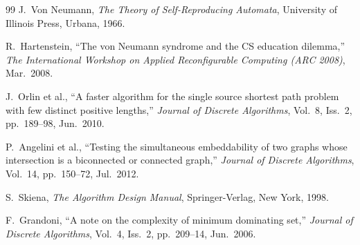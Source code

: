 \documentclass[11pt]{article}
\begin{document}
\begin{thebibliography}{99}
J.~Von Neumann,
\textit{The Theory of Self-Reproducing Automata},
University of Illinois Press, Urbana, 1966.

R.~Hartenstein,
``The von Neumann syndrome and the CS education dilemma,''
\textit{The International Workshop on Applied Reconfigurable Computing (ARC 2008)},
Mar.~2008.

J.~Orlin et al.,
``A faster algorithm for the single source shortest path problem with few distinct positive lengths,''
\textit{Journal of Discrete Algorithms},
Vol.~8, Iss.~2, pp.~189--98, Jun.~2010.

P.~Angelini et al.,
``Testing the simultaneous embeddability of two graphs whose intersection is a biconnected or connected graph,''
\textit{Journal of Discrete Algorithms},
Vol.~14, pp.~150--72, Jul.~2012.

S.~Skiena,
\textit{The Algorithm Design Manual},
Springer-Verlag, New York, 1998.

F.~Grandoni,
``A note on the complexity of minimum dominating set,''
\textit{Journal of Discrete Algorithms},
Vol.~4, Iss.~2, pp.~209--14, Jun.~2006.

\end{thebibliography}
\end{document}
